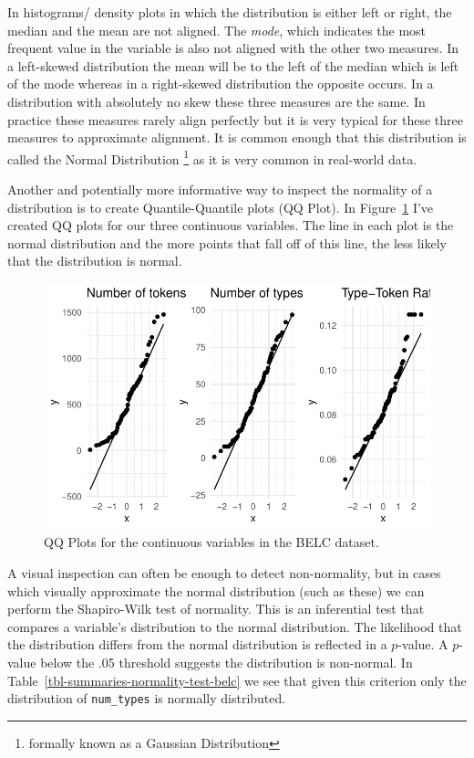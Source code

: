 \documentclass[
  letterpaper,
]{scrbook}
\begin{document}
In histograms/ density plots in which the distribution is either left or
right, the median and the mean are not aligned. The \emph{mode}, which
indicates the most frequent value in the variable is also not aligned
with the other two measures. In a left-skewed distribution the mean will
be to the left of the median which is left of the mode whereas in a
right-skewed distribution the opposite occurs. In a distribution with
absolutely no skew these three measures are the same. In practice these
measures rarely align perfectly but it is very typical for these three
measures to approximate alignment. It is common enough that this
distribution is called the Normal Distribution \footnote{formally known
  as a Gaussian Distribution} as it is very common in real-world data.

Another and potentially more informative way to inspect the normality of
a distribution is to create Quantile-Quantile plots (QQ Plot). In
Figure~\ref{fig-summaries-qqnorm-plot-belc} I've created QQ plots for
our three continuous variables. The line in each plot is the normal
distribution and the more points that fall off of this line, the less
likely that the distribution is normal.

\begin{figure}[h]

{\centering \includegraphics{./approaching-analysis_files/figure-pdf/fig-summaries-qqnorm-plot-belc-1.pdf}

}

\caption{\label{fig-summaries-qqnorm-plot-belc}QQ Plots for the
continuous variables in the BELC dataset.}

\end{figure}

A visual inspection can often be enough to detect non-normality, but in
cases which visually approximate the normal distribution (such as these)
we can perform the Shapiro-Wilk test of normality. This is an
inferential test that compares a variable's distribution to the normal
distribution. The likelihood that the distribution differs from the
normal distribution is reflected in a \(p\)-value. A \(p\)-value below
the .05 threshold suggests the distribution is non-normal. In
Table~\ref{tbl-summaries-normality-test-belc} we see that given this
criterion only the distribution of \texttt{num\_types} is normally
distributed.
\end{document}
